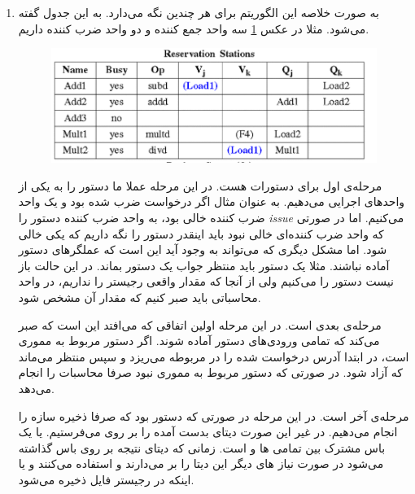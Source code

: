 \section{}
\begin{enumerate}
    \item به صورت خلاصه این الگوریتم برای هر  چندین 
    نگه می‌دارد. به این جدول
    گفته می‌شود. مثلا در عکس
    \ref{pic:reservation_status}
    سه واحد جمع کننده و دو واحد ضرب کننده داریم.
    \begin{figure}[H]
        \centering
        \includegraphics[scale=0.5]{pics/5-reservation-status.png}
        \caption{}
        \label{pic:reservation_status}
    \end{figure}
    مرحله‌ی اول برای دستورات
    هست. در این مرحله عملا ما دستور را به یکی از واحد‌های اجرایی
    می‌دهیم. به عنوان مثال اگر درخواست ضرب شده بود و یک واحد ضرب کننده خالی بود، به واحد ضرب کننده
    دستور را
    \emph{issue}
    می‌کنیم. اما در صورتی که واحد ضرب کننده‌ای خالی نبود باید اینقدر دستور را نگه داریم که یکی
    خالی شود.
    اما مشکل دیگری که می‌تواند به وجود آید این است که عملگر‌های دستور آماده نباشند. مثلا یک دستور
    باید منتظر جواب یک دستور
    بماند. در این حالت باز نیست دستور را
    می‌کنیم ولی از آنجا که مقدار واقعی رجیستر را نداریم،‌ در واحد محاسباتی باید صبر کنیم که مقدار
    آن مشخص شود.

    مرحله‌ی بعدی
    است. در این مرحله اولین اتفاقی که می‌افتد این است که صبر می‌کند که تمامی ورودی‌های دستور آماده شوند.
    اگر دستور مربوط به مموری است،‌ در ابتدا آدرس درخواست شده را در
    مربوطه می‌ریزد و سپس منتظر می‌ماند که
    آزاد شود. در صورتی که دستور مربوط به مموری نبود صرفا محاسبات را انجام می‌دهد.

    مرحله‌ی آخر
    است. در این مرحله در صورتی که دستور
    بود که صرفا ذخیره سازه را انجام می‌دهیم. در غیر این صورت دیتای بدست آمده را بر روی
    می‌فرستیم.
     یا 
    یک باس مشترک بین تمامی
    ها و 
    است. زمانی که دیتای نتیجه بر روی باس گذاشته می‌شود در صورت نیاز
    های
    دیگر این دیتا را بر می‌دارند و استفاده می‌کنند و یا اینکه در رجیستر فایل ذخیره می‌شود.


\end{enumerate}
